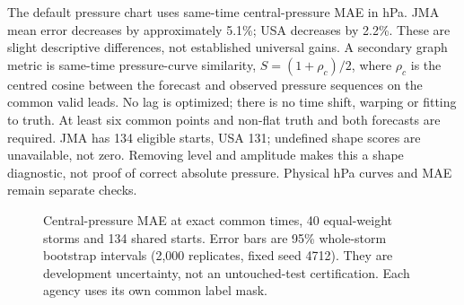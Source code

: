 \documentclass[10pt,letterpaper]{article}
\begin{document}
The default pressure chart uses same-time central-pressure MAE in hPa.
JMA mean error decreases by approximately 5.1\%; USA decreases by 2.2\%.
These are slight descriptive differences, not established universal gains.
A secondary graph metric is same-time pressure-curve similarity,
$S=(1+\rho_c)/2$, where $\rho_c$ is the centred cosine between the forecast
and observed pressure sequences on the common valid leads. No lag is optimized;
there is no time shift, warping or fitting to truth. At least six common points
and non-flat truth and both forecasts are required. JMA has 134 eligible
starts, USA 131; undefined shape scores are unavailable, not zero. Removing
level and amplitude makes this a shape diagnostic, not proof of correct
absolute pressure. Physical hPa curves and MAE remain separate checks.

\begin{figure}[H]
\centering
{}
\caption{Central-pressure MAE at exact common times, 40 equal-weight
storms and 134 shared starts. Error bars are 95\% whole-storm bootstrap intervals
(2,000 replicates, fixed seed 4712). They are development uncertainty, not an
untouched-test certification. Each agency uses its own common label mask.}
\label{fig:matchedpressure}
\end{figure}
\end{document}

